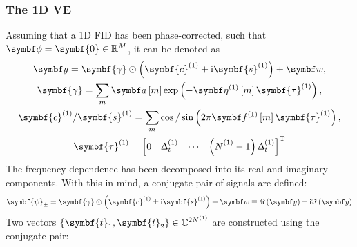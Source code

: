 \subsubsection{The \acs{1D} \acl{VE}}
Assuming that a \ac{1D} \ac{FID} has been phase-corrected, such that $\bdphi =
\symbf{0} \in \mathbb{R}^M$, it can be denoted as
\begin{subequations}
    \begin{gather}
        \by =
        \symbf{\gamma} \odot
            \left(
                \symbf{c}^{(1)} + \iu \symbf{s}^{(1)}
            \right) + \bw, \\
        \symbf{\gamma} = \sum_m \bdam \exp \left(
                - \bdetaone \left[ m \right]
                \symbf{\tau}^{(1)}
            \right), \\
            \symbf{c}^{(1)}\text{/}\symbf{s}^{(1)} = \sum_m \cos\text{/}\sin \left(
                2 \pi \bdfone \left[ m \right] \symbf{\tau}^{(1)}_{\vphantom{t}}
            \right), \\
        \symbf{\tau}^{(1)} =
            \begin{bmatrix}
                0 & \Dtone & \cdots & \left(\None_{\vphantom{t}} - 1\right) \Dtone
            \end{bmatrix}\T
    \end{gather}
\end{subequations}
The frequency-dependence has been decomposed into its real and imaginary
components. With this in mind, a conjugate pair of signals are defined:
\begin{equation}
    \symbf{\psi}_{\pm} =
        \symbf{\gamma} \odot \left(
            \symbf{c}^{(1)} \pm \iu \symbf{s}^{(1)}
            \right) + \bw \equiv
            \Re\left(\by\right) \pm \iu \Im\left(\by\right)
\end{equation}
Two vectors $\lbrace \symbf{t}_{1}, \symbf{t}_2 \rbrace \in \mathbb{C}^{2
\None}$ are constructed using the conjugate pair:

